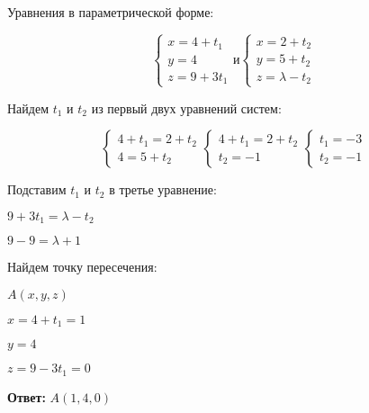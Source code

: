 Уравнения в параметрической форме:

\[\begin{cases}
x = 4 + t_1 \\
y = 4 \\
z = 9 + 3 t_1
\end{cases} \text{и} 
\begin{cases}
x = 2 + t_2 \\
y = 5 + t_2 \\
z = \lambda - t_2
\end{cases}\]

Найдем $t_1$ и $t_2$ из первый двух уравнений систем:

\[\begin{cases}
4 + t_1 = 2 + t_2 \\
4 = 5 + t_2
\end{cases}
\begin{cases}
4 + t_1 = 2 + t_2 \\
t_2 = -1
\end{cases}
\begin{cases}
t_1 = -3 \\
t_2 = -1
\end{cases}\]

Подставим $t_1$ и $t_2$ в третье уравнение:

$9 + 3t_1 = \lambda - t_2$

$9 - 9 = \lambda + 1$

Найдем точку пересечения:

$A(x, y, z)$

$x = 4 + t_1 = 1$

$y = 4$

$z = 9 - 3t_1 = 0$

\textbf{Ответ:}  $A(1, 4, 0)$
